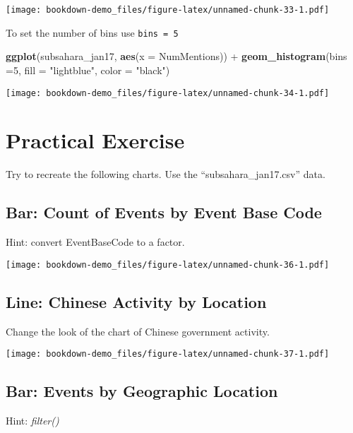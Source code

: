 \documentclass[]{book}
\newenvironment{Shaded}{\begin{snugshade}}{\end{snugshade}}
\newcommand{\KeywordTok}[1]{\textcolor[rgb]{0.13,0.29,0.53}{\textbf{{#1}}}}
\newcommand{\DataTypeTok}[1]{\textcolor[rgb]{0.13,0.29,0.53}{{#1}}}
\newcommand{\DecValTok}[1]{\textcolor[rgb]{0.00,0.00,0.81}{{#1}}}
\newcommand{\StringTok}[1]{\textcolor[rgb]{0.31,0.60,0.02}{{#1}}}
\newcommand{\NormalTok}[1]{{#1}}
\theoremstyle{definition}
\theoremstyle{definition}
\theoremstyle{remark}
\begin{document}
\texttt{[image: bookdown-demo\_files/figure-latex/unnamed-chunk-33-1.pdf]}

To set the number of bins use \texttt{bins\ =\ 5}

\begin{Shaded}
\begin{Highlighting}[]
\KeywordTok{ggplot}\NormalTok{(subsahara_jan17, }\KeywordTok{aes}\NormalTok{(}\DataTypeTok{x =} \NormalTok{NumMentions)) +}
\StringTok{  }\KeywordTok{geom_histogram}\NormalTok{(}\DataTypeTok{bins =}\DecValTok{5}\NormalTok{, }\DataTypeTok{fill =} \StringTok{"lightblue"}\NormalTok{, }\DataTypeTok{color =} \StringTok{"black"}\NormalTok{)}
\end{Highlighting}
\end{Shaded}

\texttt{[image: bookdown-demo\_files/figure-latex/unnamed-chunk-34-1.pdf]}

\chapter{Practical Exercise}\label{practical-exercise}

Try to recreate the following charts. Use the ``subsahara\_jan17.csv''
data.

\section{Bar: Count of Events by Event Base
Code}\label{bar-count-of-events-by-event-base-code}

Hint: convert EventBaseCode to a factor.

\texttt{[image: bookdown-demo\_files/figure-latex/unnamed-chunk-36-1.pdf]}

\section{Line: Chinese Activity by
Location}\label{line-chinese-activity-by-location}

Change the look of the chart of Chinese government activity.

\texttt{[image: bookdown-demo\_files/figure-latex/unnamed-chunk-37-1.pdf]}

\section{Bar: Events by Geographic
Location}\label{bar-events-by-geographic-location}

Hint: \emph{filter()}
\end{document}
